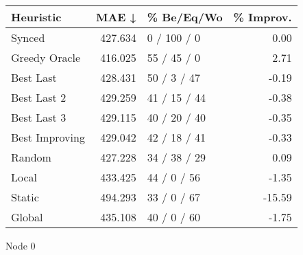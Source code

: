 \begin{tabular}{lrlr}
\toprule
\textbf{Heuristic} & \textbf{MAE ↓} & \textbf{\% Be/Eq/Wo} & \textbf{\% Improv.} \\
\midrule
            Synced &        427.634 &          0 / 100 / 0 &                0.00 \\
     Greedy Oracle &        416.025 &          55 / 45 / 0 &                2.71 \\
         Best Last &        428.431 &          50 / 3 / 47 &               -0.19 \\
       Best Last 2 &        429.259 &         41 / 15 / 44 &               -0.38 \\
       Best Last 3 &        429.115 &         40 / 20 / 40 &               -0.35 \\
    Best Improving &        429.042 &         42 / 18 / 41 &               -0.33 \\
            Random &        427.228 &         34 / 38 / 29 &                0.09 \\
             Local &        433.425 &          44 / 0 / 56 &               -1.35 \\
            Static &        494.293 &          33 / 0 / 67 &              -15.59 \\
            Global &        435.108 &          40 / 0 / 60 &               -1.75 \\
\bottomrule
\end{tabular}
\caption{Node 0}
\label{tab:non_lr05_le2_bs2_0}
